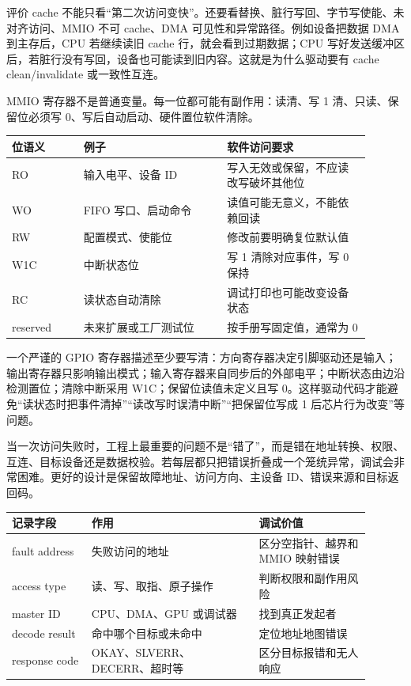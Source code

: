 评价 cache 不能只看“第二次访问变快”。还要看替换、脏行写回、字节写使能、未对齐访问、MMIO 不可 cache、DMA 可见性和异常路径。例如设备把数据 DMA 到主存后，CPU 若继续读旧 cache 行，就会看到过期数据；CPU 写好发送缓冲区后，若脏行没有写回，设备也可能读到旧内容。这就是为什么驱动要有 cache clean/invalidate 或一致性互连。

MMIO 寄存器不是普通变量。每一位都可能有副作用：读清、写 1 清、只读、保留位必须写 0、写后自动启动、硬件置位软件清除。

\begin{longtable}{L{0.18\linewidth}L{0.36\linewidth}L{0.36\linewidth}}
\toprule
位语义 & 例子 & 软件访问要求 \\
\midrule
RO & 输入电平、设备 ID & 写入无效或保留，不应读改写破坏其他位 \\
WO & FIFO 写口、启动命令 & 读值可能无意义，不能依赖回读 \\
RW & 配置模式、使能位 & 修改前要明确复位默认值 \\
W1C & 中断状态位 & 写 1 清除对应事件，写 0 保持 \\
RC & 读状态自动清除 & 调试打印也可能改变设备状态 \\
reserved & 未来扩展或工厂测试位 & 按手册写固定值，通常为 0 \\
\bottomrule
\end{longtable}

一个严谨的 GPIO 寄存器描述至少要写清：方向寄存器决定引脚驱动还是输入；输出寄存器只影响输出模式；输入寄存器来自同步后的外部电平；中断状态由边沿检测置位；清除中断采用 W1C；保留位读值未定义且写 0。这样驱动代码才能避免“读状态时把事件清掉”“读改写时误清中断”“把保留位写成 1 后芯片行为改变”等问题。

当一次访问失败时，工程上最重要的问题不是“错了”，而是错在地址转换、权限、互连、目标设备还是数据校验。若每层都只把错误折叠成一个笼统异常，调试会非常困难。更好的设计是保留故障地址、访问方向、主设备 ID、错误来源和目标返回码。

\begin{longtable}{L{0.2\linewidth}L{0.42\linewidth}L{0.28\linewidth}}
\toprule
记录字段 & 作用 & 调试价值 \\
\midrule
fault address & 失败访问的地址 & 区分空指针、越界和 MMIO 映射错误 \\
access type & 读、写、取指、原子操作 & 判断权限和副作用风险 \\
master ID & CPU、DMA、GPU 或调试器 & 找到真正发起者 \\
decode result & 命中哪个目标或未命中 & 定位地址地图错误 \\
response code & OKAY、SLVERR、DECERR、超时等 & 区分目标报错和无人响应 \\
\bottomrule
\end{longtable}

